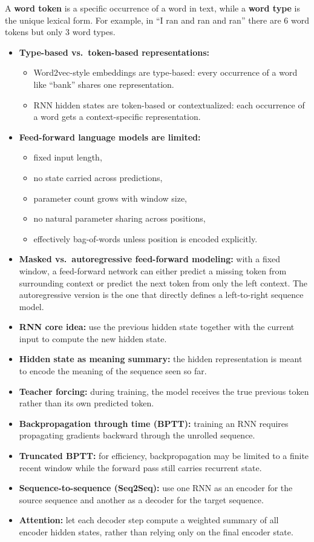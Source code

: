\documentclass[11pt]{article}
\begin{document}
A \textbf{word token} is a specific occurrence of a word in text, while a \textbf{word type} is the unique lexical form. For example, in ``I ran and ran and ran'' there are 6 word tokens but only 3 word types.

\begin{itemize}
    \item \textbf{Type-based vs.\ token-based representations:}
    \begin{itemize}
        \item Word2vec-style embeddings are type-based: every occurrence of a word like ``bank'' shares one representation.
        \item RNN hidden states are token-based or contextualized: each occurrence of a word gets a context-specific representation.
    \end{itemize}
    \item \textbf{Feed-forward language models are limited:}
    \begin{itemize}
        \item fixed input length,
        \item no state carried across predictions,
        \item parameter count grows with window size,
        \item no natural parameter sharing across positions,
        \item effectively bag-of-words unless position is encoded explicitly.
    \end{itemize}
    \item \textbf{Masked vs.\ autoregressive feed-forward modeling:} with a fixed window, a feed-forward network can either predict a missing token from surrounding context or predict the next token from only the left context. The autoregressive version is the one that directly defines a left-to-right sequence model.
    \item \textbf{RNN core idea:} use the previous hidden state together with the current input to compute the new hidden state.
    \item \textbf{Hidden state as meaning summary:} the hidden representation is meant to encode the meaning of the sequence seen so far.
    \item \textbf{Teacher forcing:} during training, the model receives the true previous token rather than its own predicted token.
    \item \textbf{Backpropagation through time (BPTT):} training an RNN requires propagating gradients backward through the unrolled sequence.
    \item \textbf{Truncated BPTT:} for efficiency, backpropagation may be limited to a finite recent window while the forward pass still carries recurrent state.
    \item \textbf{Sequence-to-sequence (Seq2Seq):} use one RNN as an encoder for the source sequence and another as a decoder for the target sequence.
    \item \textbf{Attention:} let each decoder step compute a weighted summary of all encoder hidden states, rather than relying only on the final encoder state.
\end{itemize}
\end{document}

